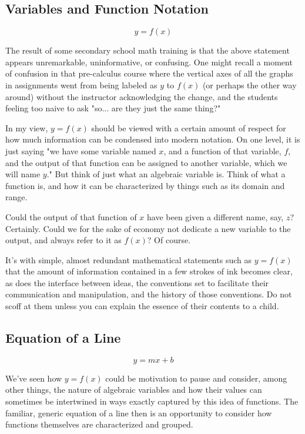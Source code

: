 \documentclass[a4paper]{article}
\begin{document}
\subsection{Variables and Function Notation}

$$ y = f(x) $$

The result of some secondary school math training is that the above statement appears unremarkable, uninformative, or confusing. One might recall a moment of confusion in that pre-calculus course where the vertical axes of all the graphs in assignments went from being labeled as $y$ to $f(x)$ (or perhaps the other way around) without the instructor acknowledging the change, and the students feeling too naive to ask "so... are they just the same thing?"

In my view, $y=f(x)$ should be viewed with a certain amount of respect for how much information can be condensed into modern notation. On one level, it is just saying "we have some variable named $x$, and a function of that variable, $f$, and the output of that function can be assigned to another variable, which we will name $y$." But think of just what an algebraic variable is. Think of what a function is, and how it can be characterized by things such as its domain and range.

Could the output of that function of $x$ have been given a different name, say, $z$? Certainly. Could we for the sake of economy not dedicate a new variable to the output, and always refer to it as $f(x)$? Of course.

It's with simple, almost redundant mathematical statements such as $y=f(x)$ that the amount of information contained in a few strokes of ink becomes clear, as does the interface between ideas, the conventions set to facilitate their communication and manipulation, and the history of those conventions. Do not scoff at them unless you can explain the essence of their contents to a child.

\subsection{Equation of a Line}

$$ y = mx + b $$

We've seen how $y=f(x)$ could be motivation to pause and consider, among other things, the nature of algebraic variables and how their values can sometimes be intertwined in ways exactly captured by this idea of functions. The familiar, generic equation of a line then is an opportunity to consider how functions themselves are characterized and grouped.
\end{document}
